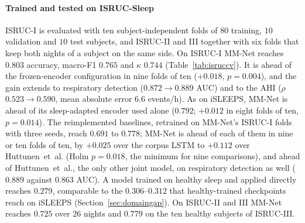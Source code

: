 \documentclass[a4paper,fleqn]{cas-sc}
\begin{document}
\paragraph{Trained and tested on ISRUC-Sleep} ISRUC-I is evaluated with ten
subject-independent folds of $80$ training, $10$ validation and $10$ test subjects, and
ISRUC-II and III together with six folds that keep both nights of a subject on the same side.
On ISRUC-I MM-Net reaches $0.803$ accuracy, macro-F1 $0.765$ and $\kappa$ $0.744$
(Table~\ref{tab:isruccv}). It is ahead of the frozen-encoder configuration in nine folds of ten
($+0.018$, $p=0.004$), and the gain extends to respiratory detection
($0.872\rightarrow0.889$ AUC) and to the AHI ($\rho$ $0.523\rightarrow0.590$, mean absolute error
$6.6$ events/h). As on iSLEEPS, MM-Net is ahead of its sleep-adapted encoder used alone ($0.792$;
$+0.012$ in eight folds of ten, $p=0.014$). The reimplemented baselines, retrained on MM-Net's
ISRUC-I folds with three seeds, reach $0.691$ to $0.778$; MM-Net is ahead of each of them in nine
or ten folds of ten, by $+0.025$ over the corpus LSTM to $+0.112$ over Huttunen~et~al. (Holm
$p=0.018$, the minimum for nine comparisons), and ahead of Huttunen~et~al., the only other joint
model, on respiratory detection as well ($0.889$ against $0.863$ AUC). A model trained on healthy sleep and applied directly reaches $0.279$, comparable to the $0.306$--$0.312$ that healthy-trained checkpoints reach on iSLEEPS (Section~\ref{sec:domaingap}). On ISRUC-II and III MM-Net
reaches $0.725$ over $26$ nights and $0.779$ on the ten healthy subjects of ISRUC-III.
\end{document}
